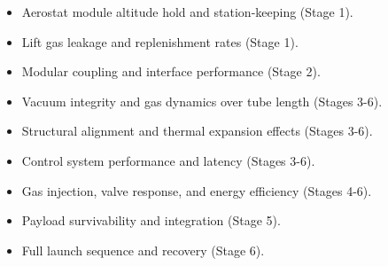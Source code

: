 \begin{itemize}
        \begin{itemize}
            \item Aerostat module altitude hold and station-keeping (Stage 1).
            \item Lift gas leakage and replenishment rates (Stage 1).
            \item Modular coupling and interface performance (Stage 2).
            \item Vacuum integrity and gas dynamics over tube length (Stages 3-6).
            \item Structural alignment and thermal expansion effects (Stages 3-6).
            \item Control system performance and latency (Stages 3-6).
            \item Gas injection, valve response, and energy efficiency (Stages 4-6).
            \item Payload survivability and integration (Stage 5).
            \item Full launch sequence and recovery (Stage 6).
        \end{itemize}
    \end{itemize}

